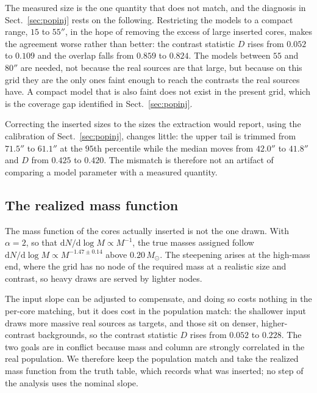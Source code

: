 \documentclass[11pt,a4paper]{article}
\newcommand{\msun}{M_{\odot}}
\begin{document}
The measured size is the one quantity that does not match, and the diagnosis
in Sect.~\ref{sec:popinj} rests on the following. Restricting the models to a
compact range, $15$ to $55''$, in the hope of removing the excess of large
inserted cores, makes the agreement worse rather than better: the contrast
statistic $D$ rises from $0.052$ to $0.109$ and the overlap falls from $0.859$
to $0.824$. The models between $55$ and $80''$ are needed, not because the
real sources are that large, but because on this grid they are the only ones
faint enough to reach the contrasts the real sources have. A compact model
that is also faint does not exist in the present grid, which is the coverage
gap identified in Sect.~\ref{sec:popinj}.

Correcting the inserted sizes to the sizes the extraction would report,
using the calibration of Sect.~\ref{sec:popinj}, changes little: the upper
tail is trimmed from $71.5''$ to $61.1''$ at the $95$th percentile while the
median moves from $42.0''$ to $41.8''$ and $D$ from $0.425$ to $0.420$. The
mismatch is therefore not an artifact of comparing a model parameter with a
measured quantity.

\subsection{The realized mass function}

The mass function of the cores actually inserted is not the one drawn. With
$\alpha=2$, so that $\mathrm{d}N/\mathrm{d}\log M \propto M^{-1}$, the true
masses assigned follow $\mathrm{d}N/\mathrm{d}\log M \propto M^{-1.47\pm0.14}$
above $0.20\,\msun$. The steepening arises at the high-mass end, where the
grid has no node of the required mass at a realistic size and contrast, so
heavy draws are served by lighter nodes.

The input slope can be adjusted to compensate, and doing so costs nothing in
the per-core matching, but it does cost in the population match: the shallower
input draws more massive real sources as targets, and those sit on denser,
higher-contrast backgrounds, so the contrast statistic $D$ rises from $0.052$
to $0.228$. The two goals are in conflict because mass and column are strongly
correlated in the real population. We therefore keep the population match and
take the realized mass function from the truth table, which records what was
inserted; no step of the analysis uses the nominal slope.

\end{document}
